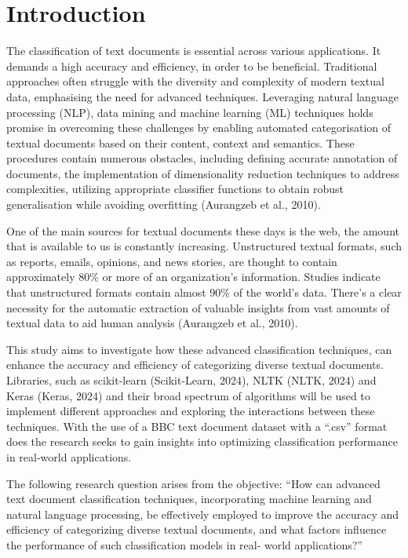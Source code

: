 \chapter{Introduction}

The classification of text documents is essential across various applications. It demands a high accuracy and efficiency, in order to be beneficial. Traditional approaches often struggle with the diversity and complexity of modern textual data, emphasising the need for advanced techniques. Leveraging natural language processing (NLP), data mining and machine learning (ML) techniques holds promise in overcoming these challenges by enabling automated categorisation of textual documents based on their content, context and semantics. These procedures contain numerous obstacles, including defining accurate annotation of documents, the implementation of dimensionality reduction techniques to address complexities, utilizing appropriate classifier functions to obtain robust generalisation while avoiding overfitting (Aurangzeb et al., 2010).

One of the main sources for textual documents these days is the web, the amount that is available to us is constantly increasing. Unstructured textual formats, such as reports, emails, opinions, and news stories, are thought to contain approximately 80\% or more of an organization's information. Studies indicate that unstructured formats contain almost 90\% of the world's data. There's a clear necessity for the automatic extraction of valuable insights from vast amounts of textual data to aid human analysis (Aurangzeb et al., 2010).

This study aims to investigate how these advanced classification techniques, can enhance the accuracy and efficiency of categorizing diverse textual documents. Libraries, such as scikit-learn (Scikit-Learn, 2024), NLTK (NLTK, 2024) and Keras (Keras, 2024) and their broad spectrum of algorithms will be used to implement different approaches and exploring the interactions between these techniques. With the use of a BBC text document dataset with a “.csv” format does the research seeks to gain insights into optimizing classification performance in real-world applications.

The following research question arises from the objective: “How can advanced text document classification techniques, incorporating machine learning and natural language processing, be effectively employed to improve the accuracy and efficiency of categorizing diverse textual documents, and what factors influence the performance of such classification models in real- world applications?”


